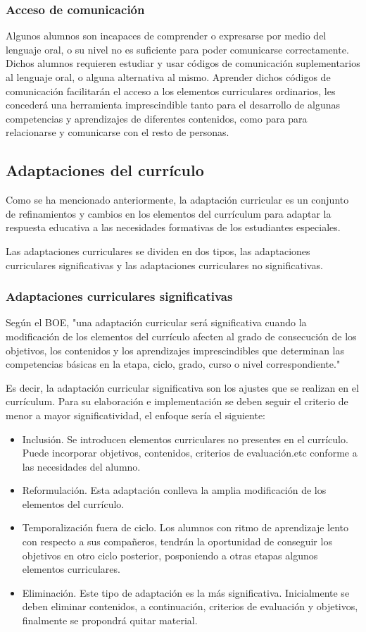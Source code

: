 \subsubsection{Acceso de comunicación}
Algunos alumnos son incapaces de comprender o expresarse por medio del lenguaje oral, o su nivel no es suficiente para poder comunicarse correctamente. Dichos alumnos requieren estudiar y usar códigos de comunicación suplementarios al lenguaje oral, o alguna alternativa al mismo. Aprender dichos códigos de comunicación facilitarán el acceso a los elementos curriculares ordinarios, les concederá una herramienta imprescindible tanto para el desarrollo de algunas competencias y aprendizajes de diferentes contenidos, como para para relacionarse y comunicarse con el resto de personas.

\subsection{Adaptaciones del currículo}
Como se ha mencionado anteriormente, la adaptación curricular es un conjunto de refinamientos y cambios en los elementos del currículum para adaptar la respuesta educativa a las necesidades formativas de los estudiantes especiales. 

Las adaptaciones curriculares se dividen en dos tipos, las adaptaciones curriculares significativas y las adaptaciones curriculares no significativas. 
\subsubsection{Adaptaciones curriculares significativas}
Según el BOE, "una adaptación curricular será significativa cuando la modificación de los elementos del currículo afecten al grado de consecución de los objetivos, los contenidos y los aprendizajes imprescindibles que determinan las competencias básicas en la etapa, ciclo, grado, curso o nivel correspondiente."

Es decir, la adaptación curricular significativa son los ajustes que se realizan en el currículum. Para su elaboración e implementación se deben seguir el criterio de menor a mayor significatividad, el enfoque sería el siguiente:
\begin{itemize}
    \item Inclusión. Se introducen elementos curriculares no presentes en el currículo. Puede incorporar objetivos, contenidos, criterios de evaluación.etc conforme a las necesidades del alumno.
    \item Reformulación. Esta adaptación conlleva la amplia modificación de los elementos del currículo.
    \item Temporalización fuera de ciclo. Los alumnos con ritmo de aprendizaje lento con respecto a sus compañeros, tendrán la oportunidad de conseguir los objetivos en otro ciclo posterior, posponiendo a otras etapas algunos elementos curriculares.
    \item Eliminación. Este tipo de adaptación es la más significativa. Inicialmente se deben eliminar contenidos, a continuación, criterios de evaluación y objetivos, finalmente se propondrá quitar material.
\end{itemize}

